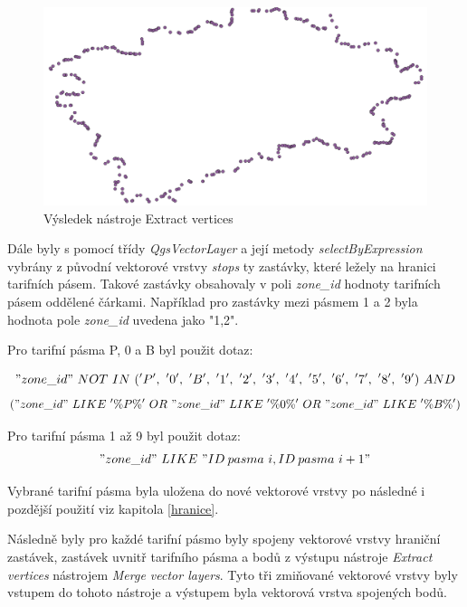 \begin{figure}[H] \centering
    \includegraphics[width=400pt]{./pictures/vertices-P0B.png}
    \caption[Výsledek nástroje Extract vertices]{Výsledek nástroje Extract vertices}
	\label{fig:vertices-P0B}              
\end{figure} 

Dále byly s pomocí třídy \textit{QgsVectorLayer} a její metody \textit{selectByExpression} vybrány 
z původní vektorové vrstvy \textit{stops} ty zastávky, které ležely na hranici tarifních pásem.
Takové zastávky obsahovaly v poli \textit{zone\_id} hodnoty tarifních pásem oddělené čárkami.
Například pro zastávky mezi pásmem 1 a 2 byla hodnota pole \textit{zone\_id} uvedena jako "1,2".

Pro tarifní pásma P, 0 a B byl použit dotaz:

\["zone\_id"\ NOT\ IN\ ('P',\ '0',\ 'B',\ '1',\ '2',\ '3',\ '4',\ '5',\ '6',\ '7',\ '8',\ '9')\ AND\]
\[("zone\_id"\ LIKE\ '\%P\%'\ OR\ "zone\_id"\ LIKE\ '\%0\%'\ OR\ "zone\_id"\ LIKE\ '\%B\%')\]

Pro tarifní pásma 1 až 9 byl použit dotaz:
\["zone\_id"\ LIKE\ "ID\: pasma\ i,ID\: pasma\ i+1"\]

Vybrané tarifní pásma byla uložena do nové vektorové vrstvy po následné i pozdější použití viz kapitola \ref{hranice}.

Následně byly pro každé tarifní pásmo byly spojeny vektorové vrstvy hraniční zastávek, 
zastávek uvnitř tarifního pásma a bodů z výstupu nástroje \textit{Extract vertices} nástrojem \textit{Merge vector layers}.
Tyto tři zmiňované vektorové vrstvy byly vstupem do tohoto nástroje a výstupem byla 
vektorová vrstva spojených bodů. 

